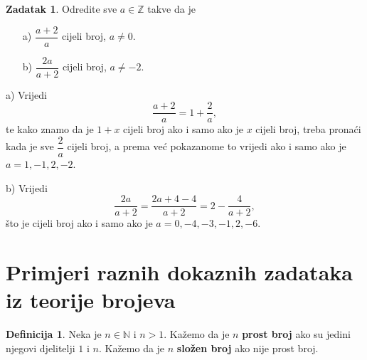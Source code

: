 \documentclass{book}
\renewenvironment{proof}{%
    \vspace{-\parskip}\begin{oldproof}%
    }{%
    \end{oldproof}%
}
\theoremstyle{definition}
\theoremstyle{definition}
\newtheorem{definition}{Definicija}
\newtheorem{exercise}{Zadatak}
\theoremstyle{remark}
\begin{document}
\begin{exercise}
Odredite sve $a\in \mathbb{Z}$ takve da je
\begin{itemize}
\item[a)] $\dfrac{a+2}{a}$ cijeli broj, $a\neq 0$.
\item[b)] $\dfrac{2a}{a+2}$ cijeli broj, $a\neq -2$.
\end{itemize}
\begin{proof}[Rješenje]
a) Vrijedi
$$\dfrac{a+2}{a}=1+\dfrac{2}{a},$$
te kako znamo da je $1+x$ cijeli broj ako i samo ako je $x$ cijeli broj, treba pronaći kada je sve $\dfrac{2}{a}$ cijeli broj, a prema već pokazanome to vrijedi ako i samo ako je $a=1, -1, 2, -2$.

b) Vrijedi
$$\dfrac{2a}{a+2}=\dfrac{2a+4-4}{a+2}=2-\dfrac{4}{a+2},$$
što je cijeli broj ako i samo ako je $a=0, -4, -3, -1, 2, -6$.
\end{proof}
\end{exercise}
\section{Primjeri raznih dokaznih zadataka iz teorije brojeva}

\begin{definition}
Neka je $n\in \mathbb{N}$ i $n>1$. Kažemo da je $n$ \textbf{prost broj} ako su jedini njegovi djelitelji $1$ i $n$. Kažemo da je $n$ \textbf{složen broj} ako nije prost broj.
\end{definition}
\end{document}
